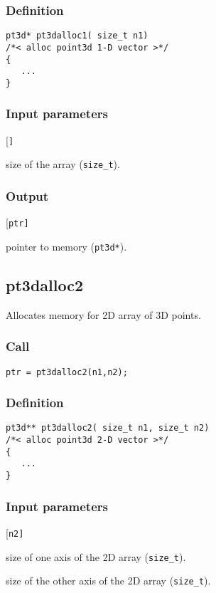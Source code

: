 \subsubsection*{Definition}
\begin{verbatim}
pt3d* pt3dalloc1( size_t n1)
/*< alloc point3d 1-D vector >*/
{
   ...
}
\end{verbatim}

\subsubsection*{Input parameters}
\begin{desclist}{\tt }{\quad}[\tt ]
   \setlength\itemsep{0pt}
   \item[n1]	size of the array (\texttt{size\_t}).
\end{desclist}

\subsubsection*{Output}
\begin{desclist}{\tt }{\quad}[\tt ptr]
   \setlength\itemsep{0pt}
   \item[ptr] pointer to memory (\texttt{pt3d*}).
\end{desclist}




\subsection{{pt3dalloc2}}
Allocates memory for 2D array of 3D points.

\subsubsection*{Call}
\begin{verbatim}
ptr = pt3dalloc2(n1,n2);\end{verbatim}

\subsubsection*{Definition}
\begin{verbatim}
pt3d** pt3dalloc2( size_t n1, size_t n2)
/*< alloc point3d 2-D vector >*/
{
   ...   
}
\end{verbatim}

\subsubsection*{Input parameters}
\begin{desclist}{\tt }{\quad}[\tt n2]
   \setlength\itemsep{0pt}
   \item[n1]	size of one axis of the 2D array (\texttt{size\_t}).
   \item[n2]	size of the other axis of the 2D array (\texttt{size\_t}).
\end{desclist}


